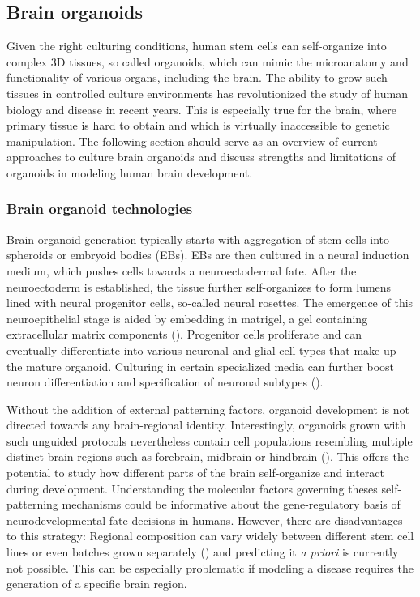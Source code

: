 \clearpage


\subsection{Brain organoids}

Given the right culturing conditions, human stem cells can self-organize into complex 3D tissues, so called organoids, which can mimic the microanatomy and functionality of various organs, including the brain. The ability to grow such tissues in controlled culture environments has revolutionized the study of human biology and disease in recent years. This is especially true for the brain, where primary tissue is hard to obtain and which is virtually inaccessible to genetic manipulation. The following section should serve as an overview of current approaches to culture brain organoids and discuss strengths and limitations of organoids in modeling human brain development.


\subsubsection{Brain organoid technologies}
Brain organoid generation typically starts with aggregation of stem cells into spheroids or embryoid bodies (EBs). EBs are then cultured in a neural induction medium, which pushes cells towards a neuroectodermal fate. After the neuroectoderm is established, the tissue further self-organizes to form lumens lined with neural progenitor cells, so-called neural rosettes. The emergence of this neuroepithelial stage is aided by embedding in matrigel, a gel containing extracellular matrix components (\cite{lancaster_cerebral_2013,eiraku_self-organizing_2011}). Progenitor cells proliferate and can eventually differentiate into various neuronal and glial cell types that make up the mature organoid. Culturing in certain specialized media can further boost neuron differentiation and specification of neuronal subtypes (\cite{bardy_neuronal_2015}). 

Without the addition of external patterning factors, organoid development is not directed towards any brain-regional identity. Interestingly, organoids grown with such unguided protocols nevertheless contain cell populations resembling multiple distinct brain regions such as forebrain, midbrain or hindbrain (\cite{lancaster_cerebral_2013,kadoshima_self-organization_2013}). This offers the potential to study how different parts of the brain self-organize and interact during development. Understanding the molecular factors governing theses self-patterning mechanisms could be informative about the gene-regulatory basis of neurodevelopmental fate decisions in humans. However, there are disadvantages to this strategy: Regional composition can vary widely between different stem cell lines or even batches grown separately (\cite{kanton_organoid_2019}) and predicting it \textit{a priori} is currently not possible. This can be especially problematic if modeling a disease requires the generation of a specific brain region.

